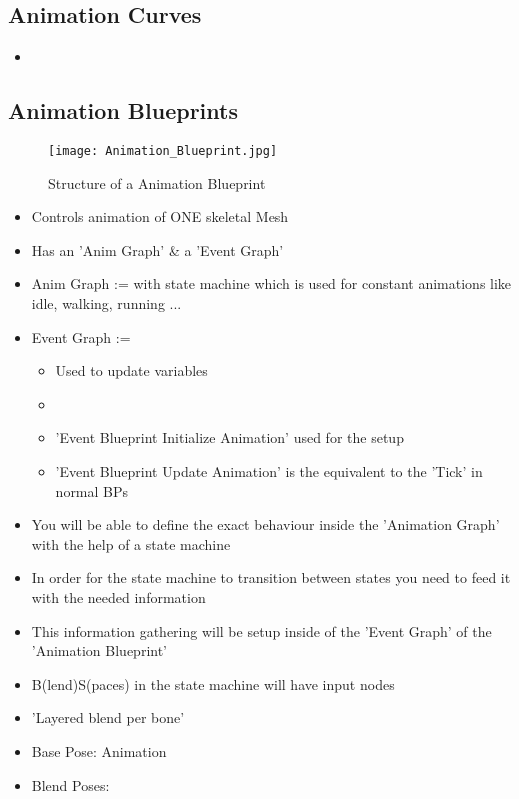         \subsection{Animation Curves}
            \begin{itemize}
                \item 
            \end{itemize}

        \subsection{Animation Blueprints}
            \begin{figure}[ht]
                \texttt{[image: Animation\_Blueprint.jpg]}
                \caption{Structure of a Animation Blueprint}
            \end{figure}
            \begin{itemize}
                \item Controls animation of ONE skeletal Mesh
                \item Has an 'Anim Graph' \& a 'Event Graph'
                \item Anim Graph := with state machine which is used for constant animations like idle, walking, running ...
                \item Event Graph := 
                \begin{itemize}
                    \item Used to update variables
                    \item 
                    \item 'Event Blueprint Initialize Animation' used for the setup
                    \item 'Event Blueprint Update Animation' is the equivalent to the 'Tick' in normal BPs
                \end{itemize}
                \item You will be able to define the exact behaviour inside the 'Animation Graph' with the help of a state machine
                \item In order for the state machine to transition between states you need to feed it with the needed information
                \item This information gathering will be setup inside of the 'Event Graph' of the 'Animation Blueprint'
            \end{itemize}

            \begin{itemize}
                \item B(lend)S(paces) in the state machine will have input nodes
                \item 'Layered blend per bone'
                \item Base Pose: Animation 
                \item Blend Poses: 
            \end{itemize}
    
